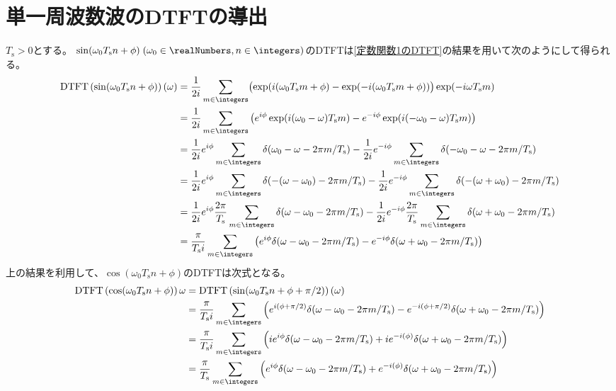     \section{単一周波数波のDTFTの導出}
        \newcommand{\Ts}{T_\mathrm{s}}
        $\Ts>0$とする。
        $\sin(\omega_0 \Ts n + \phi)\;(\omega_0\in\realNumbers, n\in\integers)$のDTFTは\ref{定数関数1のDTFT}の結果を用いて次のようにして得られる。
        \begin{align*}
            \DTFTwithArg{\sin(\omega_0 \Ts n + \phi)}{\omega} &= \frac{1}{2i}\sum_{m\in\integers} \bigl(\exp(i(\omega_0\Ts m + \phi) - \exp(-i(\omega_0\Ts m + \phi))\bigr)\exp(-i\omega\Ts m) \\
            &= \frac{1}{2i}\sum_{m\in\integers} \left(e^{i\phi}\exp(i(\omega_0-\omega)\Ts m) - e^{-i\phi}\exp(i(-\omega_0-\omega)\Ts m)\right) \\
            &= \frac{1}{2i}e^{i\phi}\sum_{m\in\integers}\delta(\omega_0-\omega - 2\pi m/\Ts) - \frac{1}{2i}e^{-i\phi}\sum_{m\in\integers}\delta(-\omega_0-\omega - 2\pi m/\Ts) \\
            &= \frac{1}{2i}e^{i\phi}\sum_{m\in\integers}\delta(-(\omega-\omega_0) - 2\pi m/\Ts) - \frac{1}{2i}e^{-i\phi}\sum_{m\in\integers}\delta(-(\omega+\omega_0) - 2\pi m/\Ts) \\
            &= \frac{1}{2i}e^{i\phi}\frac{2\pi}{\Ts}\sum_{m\in\integers}\delta(\omega-\omega_0 - 2\pi m/\Ts) - \frac{1}{2i}e^{-i\phi}\frac{2\pi}{\Ts}\sum_{m\in\integers}\delta(\omega+\omega_0 - 2\pi m/\Ts) \\
            &= \frac{\pi}{\Ts i}\sum_{m\in\integers}\left(e^{i\phi}\delta(\omega-\omega_0 - 2\pi m/\Ts) - e^{-i\phi}\delta(\omega+\omega_0 - 2\pi m/\Ts)\right)
        \end{align*}
        上の結果を利用して、$\cos(\omega_0 \Ts n + \phi)$のDTFTは次式となる。
        \begin{align*}
            \DTFT{\cos(\omega_0 \Ts n + \phi)}{\omega} &= \DTFTwithArg{\sin(\omega_0 \Tsamp n + \phi + \pi/2)}{\omega} \\
            &= \frac{\pi}{\Ts i}\sum_{m\in\integers}\left(e^{i(\phi+\pi/2)}\delta(\omega-\omega_0 - 2\pi m/\Ts) - e^{-i(\phi+\pi/2)}\delta(\omega+\omega_0 - 2\pi m/\Ts)\right) \\
            &= \frac{\pi}{\Ts i}\sum_{m\in\integers}\left(ie^{i\phi}\delta(\omega-\omega_0 - 2\pi m/\Ts) + ie^{-i(\phi)}\delta(\omega+\omega_0 - 2\pi m/\Ts)\right) \\
            &= \frac{\pi}{\Ts}\sum_{m\in\integers}\left(e^{i\phi}\delta(\omega-\omega_0 - 2\pi m/\Ts) + e^{-i(\phi)}\delta(\omega+\omega_0 - 2\pi m/\Ts)\right)
        \end{align*}
